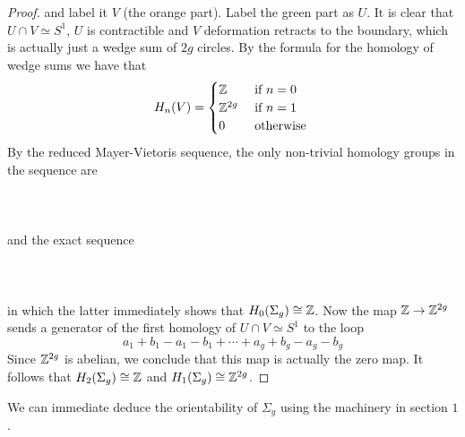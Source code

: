\documentclass[a4paper]{article}
\begin{document}
\begin{thm}{}{}
\begin{proof}
and label it $V$ (the orange part). Label the green part as $U$. It is clear that $U\cap V\simeq S^1$, $U$ is contractible and $V$ deformation retracts to the boundary, which is actually just a wedge sum of $2g$ circles. By the formula for the homology of wedge sums we have that $$H_n(V)=\begin{cases}
\mathbb{Z} & \text{ if } n=0\\
\mathbb{Z}^{2g} & \text{ if } n=1\\
0 & \text{ otherwise }
\end{cases}$$ By the reduced Mayer-Vietoris sequence, the only non-trivial homology groups in the sequence are \\~\\
\\~\\
and the exact sequence \\~\\
\\~\\
in which the latter immediately shows that $H_0(\Sigma_g)\cong\mathbb{Z}$. Now the map $\mathbb{Z}\to\mathbb{Z}^{2g}$ sends a generator of the first homology of $U\cap V\simeq S^1$ to the loop $$a_1+b_1-a_1-b_1+\cdots+a_g+b_g-a_g-b_g$$ Since $\mathbb{Z}^{2g}$ is abelian, we conclude that this map is actually the zero map. It follows that $H_2(\Sigma_g)\cong\mathbb{Z}$ and $H_1(\Sigma_g)\cong\mathbb{Z}^{2g}$. 
\end{proof}
\end{thm}

We can immediate deduce the orientability of $\Sigma_g$ using the machinery in section $1$. 
\end{document}
